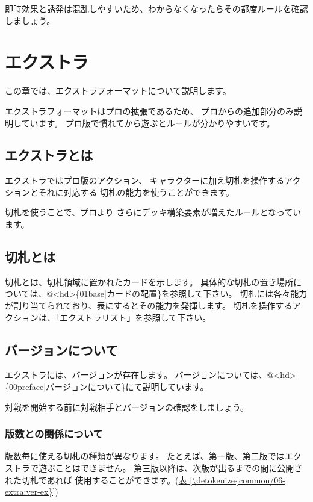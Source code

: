 \documentclass[letterpaper,10pt,dvipdfmx]{sphinxmanual}
\begin{document}
即時効果と誘発は混乱しやすいため、わからなくなったらその都度ルールを確認しましょう。


\section{エクストラ}
\label{\detokenize{common/06-extra:id1}}\label{\detokenize{common/06-extra::doc}}
この章では、エクストラフォーマットについて説明します。

エクストラフォーマットはプロの拡張であるため、
プロからの追加部分のみ説明しています。
プロ版で慣れてから遊ぶとルールが分かりやすいです。


\subsection{エクストラとは}
\label{\detokenize{common/06-extra:id2}}
エクストラではプロ版のアクション、
キャラクターに加え切札を操作するアクションとそれに対応する
切札の能力を使うことができます。

切札を使うことで、プロより
さらにデッキ構築要素が増えたルールとなっています。


\subsection{切札とは}
\label{\detokenize{common/06-extra:id3}}
切札とは、切札領域に置かれたカードを示します。
具体的な切札の置き場所については、@\textless{}hd\textgreater{}\{01\sphinxhyphen{}base|カードの配置\}を参照して下さい。
切札には各々能力が割り当てられており、表にするとその能力を発揮します。
切札を操作するアクションは、「エクストラリスト」を参照して下さい。


\subsection{バージョンについて}
\label{\detokenize{common/06-extra:id4}}
エクストラには、バージョンが存在します。
バージョンについては、@\textless{}hd\textgreater{}\{00\sphinxhyphen{}preface|バージョンについて\}にて説明しています。

対戦を開始する前に対戦相手とバージョンの確認をしましょう。


\subsubsection{版数との関係について}
\label{\detokenize{common/06-extra:id5}}
版数毎に使える切札の種類が異なります。
たとえば、第一版、第二版ではエクストラで遊ぶことはできません。
第三版以降は、次版が出るまでの間に公開された切札であれば
使用することができます。(\hyperref[\detokenize{common/06-extra:ver-ex}]{表 \ref{\detokenize{common/06-extra:ver-ex}}})
\end{document}
